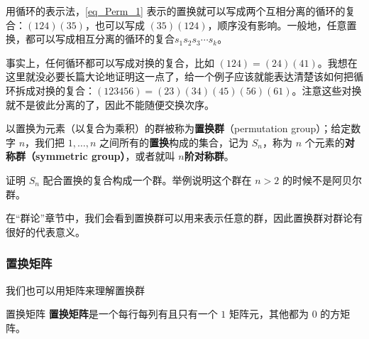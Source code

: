 用循环的表示法，\autoref{eq_Perm_1}  表示的置换就可以写成两个互相分离的循环的复合：$(1 2 4)(3 5)$，也可以写成 $(3 5 )(1 2 4)$，顺序没有影响。一般地，任意置换，都可以写成相互分离的循环的复合$s_1s_2s_3\cdots s_k$。

事实上，任何循环都可以写成对换的复合，比如 $(1 2 4) = (2 4)(4 1)$。我想在这里就没必要长篇大论地证明这一点了，给一个例子应该就能表达清楚该如何把循环拆成对换的复合：$(1 2 3 4 5 6) = (2 3)(3 4)(4 5)(5 6)(6 1)$。注意这些对换就不是彼此分离的了，因此不能随便交换次序。

以置换为元素（以复合为乘积）的群被称为\textbf{置换群}（permutation group）；给定数字 $n$，我们把 $1, \dots, n$ 之间所有的\textbf{置换}构成的集合，记为 $S_n$，称为 $n$ 个元素的\textbf{对称群（symmetric group）}，或者就叫 $n$\textbf{阶对称群}。

\begin{exercise}{}
证明 $S_n$ 配合置换的复合构成一个群。举例说明这个群在 $n>2$ 的时候不是阿贝尔群。
\end{exercise}

在“群论”章节中，我们会看到置换群可以用来表示任意的群，因此置换群对群论有很好的代表意义。

\subsubsection{置换矩阵}

我们也可以用矩阵来理解置换群

\begin{definition}{置换矩阵}
\textbf{置换矩阵}是一个每行每列有且只有一个 $1$ 矩阵元，其他都为 $0$ 的方矩阵。
\end{definition}

\begin{example}{}

\end{example}






